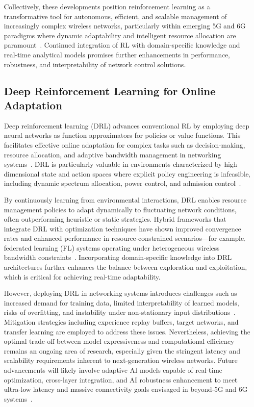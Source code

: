 \documentclass[sigconf]{acmart}
\begin{document}
Collectively, these developments position reinforcement learning as a transformative tool for autonomous, efficient, and scalable management of increasingly complex wireless networks, particularly within emerging 5G and 6G paradigms where dynamic adaptability and intelligent resource allocation are paramount~\cite{ref7,ref50}. Continued integration of RL with domain-specific knowledge and real-time analytical models promises further enhancements in performance, robustness, and interpretability of network control solutions.

\subsection{Deep Reinforcement Learning for Online Adaptation}

Deep reinforcement learning (DRL) advances conventional RL by employing deep neural networks as function approximators for policies or value functions. This facilitates effective online adaptation for complex tasks such as decision-making, resource allocation, and adaptive bandwidth management in networking systems~\cite{ref4,ref8,ref13,ref15,ref50}. DRL is particularly valuable in environments characterized by high-dimensional state and action spaces where explicit policy engineering is infeasible, including dynamic spectrum allocation, power control, and admission control~\cite{ref4,ref8}.

By continuously learning from environmental interactions, DRL enables resource management policies to adapt dynamically to fluctuating network conditions, often outperforming heuristic or static strategies. Hybrid frameworks that integrate DRL with optimization techniques have shown improved convergence rates and enhanced performance in resource-constrained scenarios—for example, federated learning (FL) systems operating under heterogeneous wireless bandwidth constraints~\cite{ref50}. Incorporating domain-specific knowledge into DRL architectures further enhances the balance between exploration and exploitation, which is critical for achieving real-time adaptability.

However, deploying DRL in networking systems introduces challenges such as increased demand for training data, limited interpretability of learned models, risks of overfitting, and instability under non-stationary input distributions~\cite{ref13}. Mitigation strategies including experience replay buffers, target networks, and transfer learning are employed to address these issues. Nevertheless, achieving the optimal trade-off between model expressiveness and computational efficiency remains an ongoing area of research, especially given the stringent latency and scalability requirements inherent to next-generation wireless networks. Future advancements will likely involve adaptive AI models capable of real-time optimization, cross-layer integration, and AI robustness enhancement to meet ultra-low latency and massive connectivity goals envisaged in beyond-5G and 6G systems~\cite{ref13,ref50}.
\end{document}
